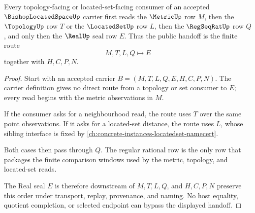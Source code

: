 \begin{theorem}
\label{thm:bishop-located-space-metric-topology-handoff}
Every topology-facing or located-set-facing consumer of an accepted $\BishopLocatedSpaceUp$ carrier first reads the $\MetricUp$ row $M$, then the $\TopologyUp$ row $T$ or the $\LocatedSetUp$ row $L$, then the $\RegSeqRatUp$ row $Q$, and only then the $\RealUp$ seal row $E$. Thus the public handoff is the finite route
$$
M,T,L,Q \longmapsto E
$$
together with $H,C,P,N$.
\end{theorem}
\begin{proof}
Start with an accepted carrier $B=(M,T,L,Q,E,H,C,P,N)$. The carrier definition gives no direct route from a topology or set consumer to $E$; every read begins with the metric observations in $M$.

If the consumer asks for a neighbourhood read, the route uses $T$ over the same point observations. If it asks for a located-set distance, the route uses $L$, whose sibling interface is fixed by \autoref{ch:concrete-instances-locatedset-namecert}.

Both cases then pass through $Q$. The regular rational row is the only row that packages the finite comparison windows used by the metric, topology, and located-set reads.

The Real seal $E$ is therefore downstream of $M,T,L,Q$, and $H,C,P,N$ preserve this order under transport, replay, provenance, and naming. No host equality, quotient completion, or selected endpoint can bypass the displayed handoff.
\end{proof}


